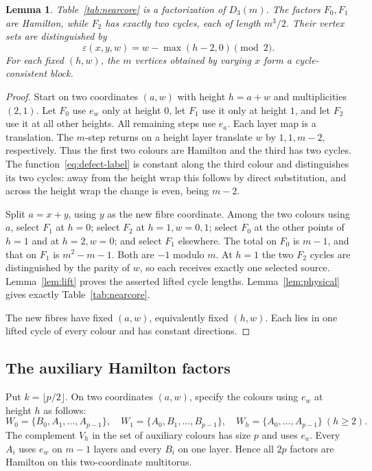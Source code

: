 \documentclass[11pt,reqno]{amsart}
\numberwithin{equation}{section}
\newtheorem{lemma}[theorem]{Lemma}
\theoremstyle{definition}
\theoremstyle{remark}
\newcommand{\ep}{\varepsilon}
\begin{document}
\begin{lemma}\label{lem:nearcore}
Table~\ref{tab:nearcore} is a factorization of $D_3(m)$. The factors $F_0,F_1$
are Hamilton, while $F_2$ has exactly two cycles, each of length $m^3/2$.
Their vertex sets are distinguished by
\begin{equation}\label{eq:defect-label}
 \ep(x,y,w)=w-\max(h-2,0)\pmod2.
\end{equation}
For each fixed $(h,w)$, the $m$ vertices obtained by varying $x$ form a
cycle-consistent block.
\end{lemma}
\begin{proof}
Start on two coordinates $(a,w)$ with height $h=a+w$ and multiplicities $(2,1)$.
Let $F_0$ use $e_w$ only at height $0$, let $F_1$ use it only at height $1$, and
let $F_2$ use it at all other heights. All remaining steps use $e_a$. Each layer
map is a translation. The $m$-step returns on a height layer translate $w$ by
$1,1,m-2$, respectively. Thus the first two colours are Hamilton and the third
has two cycles. The function~\eqref{eq:defect-label} is constant along the third
colour and distinguishes its two cycles: away from the height wrap this follows
by direct substitution, and across the height wrap the change is even, being $m-2$.

Split $a=x+y$, using $y$ as the new fibre coordinate. Among the two colours using
$a$, select $F_1$ at $h=0$; select $F_2$ at $h=1,w=0,1$; select $F_0$ at the other
points of $h=1$ and at $h=2,w=0$; and select $F_1$ elsewhere. The total on $F_0$
is $m-1$, and that on $F_1$ is $m^2-m-1$. Both are $-1$ modulo $m$. At $h=1$ the
two $F_2$ cycles are distinguished by the parity of $w$, so each receives exactly
one selected source. Lemma~\ref{lem:lift} proves the asserted lifted cycle lengths.
Lemma~\ref{lem:physical} gives exactly Table~\ref{tab:nearcore}.

The new fibres have fixed $(a,w)$, equivalently fixed $(h,w)$. Each lies in one
lifted cycle of every colour and has constant directions.
\end{proof}

\subsection{The auxiliary Hamilton factors}
Put $k=\lfloor p/2\rfloor$. On two coordinates $(a,w)$, specify the colours
using $e_w$ at height $h$ as follows:
\begin{equation}\label{eq:shell-W}
 W_0=\{B_0,A_1,\ldots,A_{p-1}\},\quad
 W_1=\{A_0,B_1,\ldots,B_{p-1}\},\quad
 W_h=\{A_0,\ldots,A_{p-1}\}\ (h\ge2).
\end{equation}
The complement $V_h$ in the set of auxiliary colours has size $p$ and uses $e_a$.
Every $A_i$ uses $e_w$ on $m-1$ layers and every $B_i$ on one layer. Hence all
$2p$ factors are Hamilton on this two-coordinate multitorus.
\end{document}
